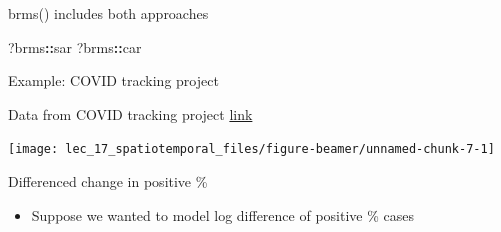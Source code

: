 \documentclass[
  ignorenonframetext,
]{beamer}
\newenvironment{Shaded}{\begin{snugshade}}{\end{snugshade}}
\newcommand{\DataTypeTok}[1]{\textcolor[rgb]{0.13,0.29,0.53}{#1}}
\newcommand{\DecValTok}[1]{\textcolor[rgb]{0.00,0.00,0.81}{#1}}
\newcommand{\KeywordTok}[1]{\textcolor[rgb]{0.13,0.29,0.53}{\textbf{#1}}}
\newcommand{\NormalTok}[1]{#1}
\newcommand{\OperatorTok}[1]{\textcolor[rgb]{0.81,0.36,0.00}{\textbf{#1}}}
\newcommand{\StringTok}[1]{\textcolor[rgb]{0.31,0.60,0.02}{#1}}
\providecommand{\tightlist}{%
  \setlength{\itemsep}{0pt}\setlength{\parskip}{0pt}}
\begin{document}
\begin{frame}[fragile]{brms() includes both approaches}
\protect\hypertarget{brms-includes-both-approaches}{}

\begin{Shaded}
\begin{Highlighting}[]
\NormalTok{?brms}\OperatorTok{::}\NormalTok{sar}
\NormalTok{?brms}\OperatorTok{::}\NormalTok{car}
\end{Highlighting}
\end{Shaded}

\end{frame}

\begin{frame}{Example: COVID tracking project}
\protect\hypertarget{example-covid-tracking-project}{}

Data from COVID tracking project
\href{https://covidtracking.com/data/download}{link}

\begin{center}\texttt{[image: lec\_17\_spatiotemporal\_files/figure-beamer/unnamed-chunk-7-1]} \end{center}

\end{frame}

\begin{frame}[fragile]{Differenced change in positive \%}
\protect\hypertarget{differenced-change-in-positive}{}

\begin{itemize}
\tightlist
\item
  Suppose we wanted to model log difference of positive \% cases
\end{itemize}

\begin{Shaded}
\end{Shaded}

\end{frame}
\end{document}
